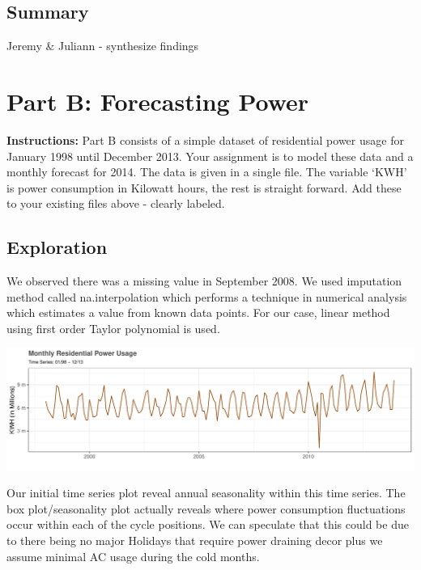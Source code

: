 \documentclass[openany]{book}
\renewenvironment{quote}{\begin{myquote}}{\end{myquote}}
\begin{document}
\hypertarget{summary}{%
\section{Summary}\label{summary}}

Jeremy \& Juliann - synthesize findings

\hypertarget{part-b-forecasting-power}{%
\chapter{Part B: Forecasting Power}\label{part-b-forecasting-power}}

\begin{quote}
\textbf{Instructions:} Part B consists of a simple dataset of
residential power usage for January 1998 until December 2013. Your
assignment is to model these data and a monthly forecast for 2014. The
data is given in a single file. The variable `KWH' is power consumption
in Kilowatt hours, the rest is straight forward. Add these to your
existing files above - clearly labeled.
\end{quote}

\hypertarget{exploration-1}{%
\section{Exploration}\label{exploration-1}}

We observed there was a missing value in September 2008. We used
imputation method called na.interpolation which performs a technique in
numerical analysis which estimates a value from known data points. For
our case, linear method using first order Taylor polynomial is used.

\includegraphics{Group2_Project1_Fall2019_files/figure-latex/unnamed-chunk-9-1.pdf}

Our initial time series plot reveal annual seasonality within this time
series. The box plot/seasonality plot actually reveals where power
consumption fluctuations occur within each of the cycle positions. We
can speculate that this could be due to there being no major Holidays
that require power draining decor plus we assume minimal AC usage during
the cold months.
\end{document}
